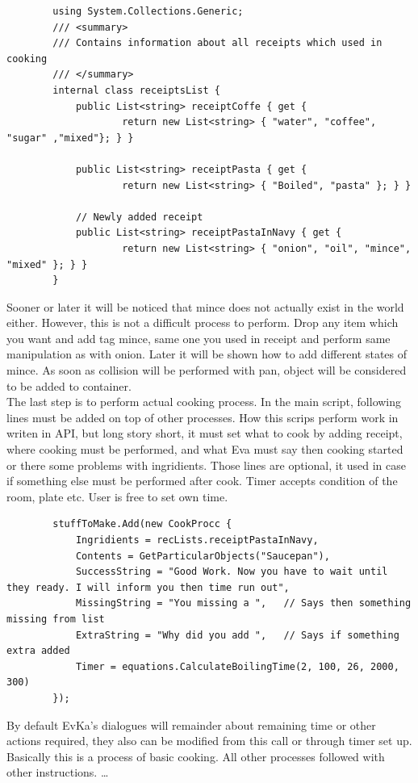 \documentclass[18pt]{article}
\numberwithin{equation}{section} %
\numberwithin{figure}{section} %
\numberwithin{table}{section} %
\begin{document}
		\lstset{style=sharpc}
		\begin{lstlisting}
		using System.Collections.Generic;
		/// <summary>
		/// Contains information about all receipts which used in cooking
		/// </summary>
		internal class receiptsList {    
			public List<string> receiptCoffe { get { 
					return new List<string> { "water", "coffee", "sugar" ,"mixed"}; } }
					
			public List<string> receiptPasta { get { 
					return new List<string> { "Boiled", "pasta" }; } }
			
			// Newly added receipt		
			public List<string> receiptPastaInNavy { get { 
					return new List<string> { "onion", "oil", "mince", "mixed" }; } }
		}
		\end{lstlisting}
		
		Sooner or later it will be noticed that mince does not actually exist in the world either. However, this is not a difficult process to perform. Drop any item which you want and add tag mince, same one you used in receipt and perform same manipulation as with onion. Later it will be shown how to add different states of mince. As soon as collision will be performed with pan, object will be considered to be added to container. \\
		
		The last step is to perform actual cooking process. In the main script, following lines must be added on top of other processes. How this scrips perform work in writen in API, but long story short, it must set what to cook by adding receipt, where cooking must be performed, and what Eva must say then cooking started or there some problems with ingridients. Those lines are optional, it used in case if something else must be performed after cook. Timer accepts condition of the room, plate etc. User is free to set own time.
		
		\lstset{style=sharpc}
		\begin{lstlisting}
		stuffToMake.Add(new CookProcc {
			Ingridients = recLists.receiptPastaInNavy,
			Contents = GetParticularObjects("Saucepan"),
			SuccessString = "Good Work. Now you have to wait until they ready. I will inform you then time run out",
			MissingString = "You missing a ",	// Says then something missing from list
			ExtraString = "Why did you add ",	// Says if something extra added
			Timer = equations.CalculateBoilingTime(2, 100, 26, 2000, 300)
		});
		\end{lstlisting}
		By default EvKa's dialogues will remainder about remaining time or other actions required, they also can be modified from this call or through timer set up. Basically this is a process of basic cooking. All other processes followed with other instructions. \ldots
		
\end{document}
